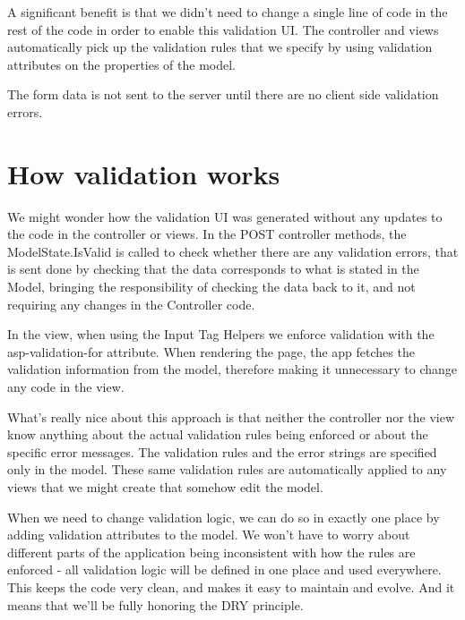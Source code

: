 \documentclass{report}
\begin{document}
    A significant benefit is that we didn't need to change a single line of code in the
    rest of the code in order to enable this validation UI. The controller and views
    automatically pick up the validation rules that we specify by using validation
    attributes on the properties of the model.

    The form data is not sent to the server until there are no client side validation
    errors.

    \section{How validation works}
    We might wonder how the validation UI was generated without any updates to the code
    in the controller or views. In the POST controller methods, the ModelState.IsValid is
    called to check whether there are any validation errors, that is sent done by checking
    that the data corresponds to what is stated in the Model, bringing the responsibility
    of checking the data back to it, and not requiring any changes in the Controller code.

    In the view, when using the Input Tag Helpers we enforce validation with the
    asp-validation-for attribute. When rendering the page, the app fetches the validation
    information from the model, therefore making it unnecessary to change any code in the
    view.

    What's really nice about this approach is that neither the controller nor the view know
    anything about the actual validation rules being enforced or about the specific error
    messages. The validation rules and the error strings are specified only in the model.
    These same validation rules are automatically applied to any views that we might create
    that somehow edit the model.

    When we need to change validation logic, we can do so in exactly one place by adding
    validation attributes to the model. We won't have to worry about different parts of
    the application being inconsistent with how the rules are enforced - all validation logic
    will be defined in one place and used everywhere. This keeps the code very clean, and makes
    it easy to maintain and evolve. And it means that we'll be fully honoring the DRY principle.
\end{document}
